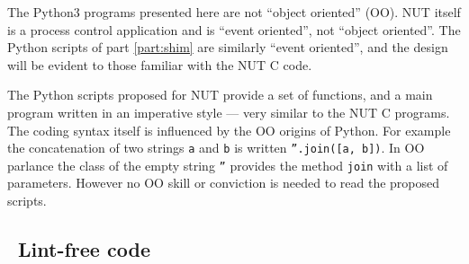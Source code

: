 \documentclass[12pt]{article}
\newlength{\headersep}\setlength{\headersep}{3mm}
\newcommand{\Hsep}{\hspace{\headersep}}
\begin{document}
The Python3 programs presented here are not ``object oriented'' (OO).  NUT
itself is a process control application and is ``event oriented'', not
``object oriented''.  The Python scripts of part \ref{part:shim} are
similarly ``event oriented'', and the design will be evident to those
familiar with the NUT C code.  

The Python scripts proposed for NUT provide a set of functions, and a main
program written in an imperative style --- very similar to the NUT C programs.
The coding syntax itself is influenced by the OO origins of Python.  For
example the concatenation of two strings \texttt{a} and \texttt{b} is written
\texttt{''.join([a, b])}.  In OO parlance the class of the empty string
\texttt{''} provides the method \texttt{join} with a list of parameters.
However no OO skill or conviction is needed to read the proposed scripts.

\subsection{\Hsep\ Lint-free code}\label{section:lint}
\end{document}

